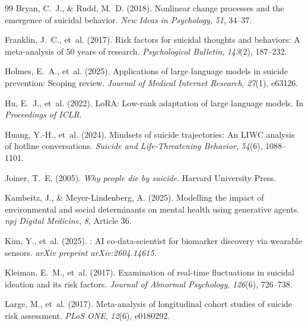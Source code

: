 \documentclass[review,12pt,authoryear]{elsarticle}
\begin{document}
\begin{thebibliography}{99}
Bryan, C.~J., \& Rudd, M.~D. (2018).
\newblock Nonlinear change processes and the emergence of suicidal behavior.
\newblock \textit{New Ideas in Psychology}, \textit{51}, 34--37.

Franklin, J.~C., et~al. (2017).
\newblock Risk factors for suicidal thoughts and behaviors: {A} meta-analysis of 50 years of research.
\newblock \textit{Psychological Bulletin}, \textit{143}(2), 187--232.

Holmes, E.~A., et~al. (2025).
\newblock Applications of large language models in suicide prevention: {S}coping review.
\newblock \textit{Journal of Medical Internet Research}, \textit{27}(1), e63126.

Hu, E.~J., et~al. (2022).
\newblock Lo{RA}: {L}ow-rank adaptation of large language models.
\newblock In \textit{Proceedings of ICLR}.

Huang, Y.-H., et~al. (2024).
\newblock Mindsets of suicide trajectories: {A}n {LIWC} analysis of hotline conversations.
\newblock \textit{Suicide and Life-Threatening Behavior}, \textit{54}(6), 1088--1101.

Joiner, T.~E. (2005).
\newblock \textit{Why people die by suicide}.
\newblock Harvard University Press.

Kambeitz, J., \& Meyer-Lindenberg, A. (2025).
\newblock Modelling the impact of environmental and social determinants on mental health using generative agents.
\newblock \textit{npj Digital Medicine}, \textit{8}, Article 36.

Kim, Y., et~al. (2025).
: {AI} co-data-scientist for biomarker discovery via wearable sensors.
\newblock \textit{arXiv preprint arXiv:2604.14615}.

Kleiman, E.~M., et~al. (2017).
\newblock Examination of real-time fluctuations in suicidal ideation and its risk factors.
\newblock \textit{Journal of Abnormal Psychology}, \textit{126}(6), 726--738.

Large, M., et~al. (2017).
\newblock Meta-analysis of longitudinal cohort studies of suicide risk assessment.
\newblock \textit{PLoS ONE}, \textit{12}(6), e0180292.



\end{thebibliography}
\end{document}
